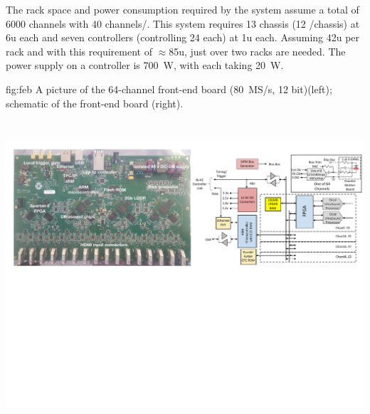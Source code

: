 The rack space and power consumption required by the system assume %
a total of 6000 channels with 40 channels/. This system requires 13 chassis (12 /chassis) at 6u each and seven controllers (controlling 24  each) at 1u each. Assuming 42u per rack and with this requirement of $\approx$85u, just over  two racks are needed. The power supply on a controller is 700~W, with each  taking 20~W. 
 

\begin{dunefigure}
 {fig:feb}
 {A picture of the 64-channel  front-end board (80~MS/s, 12 bit)(left); schematic of the front-end board (right).}
\includegraphics[height=4.8in]{graphics/pds-feb-tdr.pdf} 
\vspace{-6.3cm}
\end{dunefigure}



